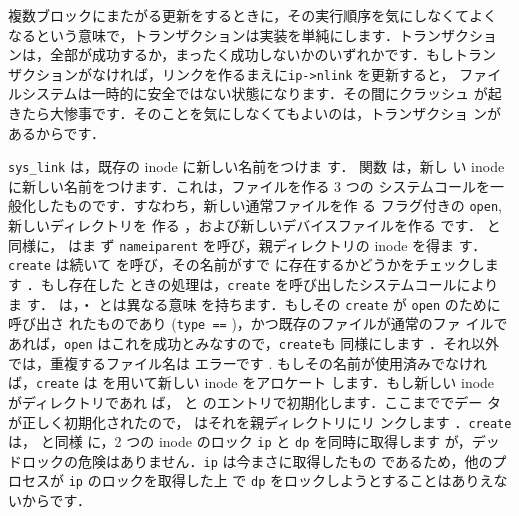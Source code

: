 複数ブロックにまたがる更新をするときに，その実行順序を気にしなくてよく
なるという意味で，トランザクションは実装を単純にします．トランザクショ
ンは，全部が成功するか，まったく成功しないかのいずれかです．もしトラン
ザクションがなければ，リンクを作るまえに\texttt{ip->nlink} を更新すると，
ファイルシステムは一時的に安全ではない状態になります．その間にクラッシュ
が起きたら大惨事です．そのことを気にしなくてもよいのは，トランザクショ
ンがあるからです．

\texttt{sys\_link} は，既存の inode に新しい名前をつけま
す． 関数  は，新し
い inode に新しい名前をつけます．これは，ファイルを作る 3 つの
システムコールを一般化したものです．すなわち，新しい通常ファイルを作
る  フラグ付きの \texttt{open}, 新しいディレクトリを
作る ，および新しいデバイスファイルを作る 
です． と同様に， はま
ず \texttt{nameiparent} を呼び，親ディレクトリの inode を得ま
す．\texttt{create} は続いて  を呼び，その名前がすで
に存在するかどうかをチェックします ．もし存在した
ときの処理は，\texttt{create} を呼び出したシステムコールによりま
す． は，・ とは異なる意味
を持ちます．もしその \texttt{create} が \texttt{open} のために呼び出さ
れたものであり (\texttt{type ==} )，かつ既存のファイルが通常のファ
イルであれば，\texttt{open} はこれを成功とみなすので，\texttt{create}も
同様にします ．それ以外では，重複するファイル名は
エラーです . もしその名前が使用済みでなけれ
ば，\texttt{create} は   を用いて新しい inode をアロケート
します．もし新しい inode がディレクトリであれ
ば， と  のエントリで初期化します．ここまででデー
タが正しく初期化されたので， はそれを親ディレクトリにリ
ンクします ．\texttt{create} は， と同様
に，2 つの inode のロック \texttt{ip} と \texttt{dp} を同時に取得します
が，デッドロックの危険はありません．\texttt{ip} は今まさに取得したもの
であるため，他のプロセスが \texttt{ip} のロックを取得した上
で \texttt{dp} をロックしようとすることはありえないからです．

